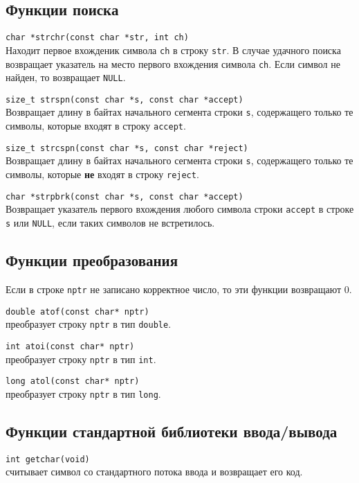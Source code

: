 \subsection*{Функции поиска}

\verb|char *strchr(const char *str, int ch)| \\
Находит первое вхожденик символа \verb|сh| в строку \verb|str|.
В случае удачного поиска возвращает указатель на место первого
вхождения символа \verb|сh|. Если символ не найден, то возвращает \verb|NULL|.

\verb|size_t strspn(const char *s, const char *accept)|\\
Возвращает длину в байтах начального сегмента строки \verb|s|, содержащего
только те символы, которые входят в строку \verb|accept|.

\verb|size_t strcspn(const char *s, const char *reject)|\\
Возвращает длину в байтах начального сегмента строки \verb|s|, содержащего
только те символы, которые \textbf{не} входят в строку \verb|reject|.

\verb|char *strpbrk(const char *s, const char *accept)|\\
Возвращает указатель  первого вхождения любого символа строки \verb|accept| в строке \verb|s|
или \verb|NULL|, если таких символов не встретилось.

\subsection*{Функции преобразования}
Если в строке \verb|nptr| не записано корректное число, то эти функции
возвращают 0.

\verb|double atof(const char* nptr)|\\
преобразует строку \verb|nptr| в тип \verb|double|.

\verb|int atoi(const char* nptr)|\\
преобразует строку \verb|nptr| в тип \verb|int|.

\verb|long atol(const char* nptr)|\\
преобразует строку \verb|nptr| в тип \verb|long|.

\subsection*{Функции стандартной библиотеки ввода/вывода}

\verb|int getchar(void)|\\
считывает символ со стандартного потока ввода и возвращает его код.

